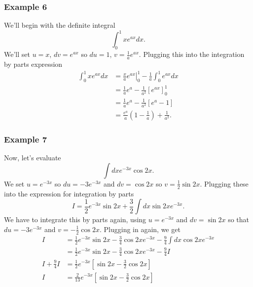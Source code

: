 \documentclass{article}
\begin{document}
\subsubsection*{Example 6}

We'll begin with the definite integral 
\begin{equation}
	\int_0^1 x e^{ax} dx .
\end{equation}
We'll set $u = x$, $dv = e^{ax}$ so $du = 1$, $v = \frac{1}{a} e^{ax}$.
Plugging this into the integration by parts expression 
\begin{align*}
	\int_0^1 x e^{ax} dx &= \left. \frac{x}{a} e^{ax} \right|_0^1 - \frac{1}{a} \int_0^1  e^{ax} dx \\
	&= \frac{1}{a} e^a - \frac{1}{a^2} \left[ e^{ax} \right]_0^1 \\
	&= \frac{1}{a} e^a - \frac{1}{a^2} \left[ e^{a} -1 \right] \\
	&= \frac{e^a}{a} \left( 1 - \frac{1}{a} \right) + \frac{1}{a^2} .
\end{align*}

\subsubsection*{Example 7}

Now, let's evaluate
\begin{equation}
	\int dx e^{-3x} \cos 2x .
\end{equation}
We set $u = e^{-3x}$ so $du = -3 e^{-3x}$ and $dv = \cos 2x$ so $v = \frac{1}{2} \sin 2x$.
Plugging these into the expression for integration by parts
\begin{equation*}
	I = \frac{1}{2} e^{-3x} \sin 2x + \frac{3}{2} \int dx \sin 2x e^{-3x} .
\end{equation*}
We have to integrate this by parts again, using $u = e^{-3x}$ and $dv = \sin 2x$ so that $du = -3 e^{-3x}$ and $v = -\frac{1}{2} \cos 2x$.
Plugging in again, we get
\begin{align*}
	I &= \frac{1}{2} e^{-3x} \sin 2x - \frac{3}{4} \cos 2x e^{-3x} - \frac{9}{4} \int dx \cos 2x e^{-3x} \\
	&= \frac{1}{2} e^{-3x} \sin 2x - \frac{3}{4} \cos 2x e^{-3x} - \frac{9}{4} I \\
	I + \frac{9}{4} I &= \frac{1}{2} e^{-3x} \left[ \sin 2x - \frac{3}{2} \cos 2x \right] \\
	I &= \frac{2}{13} e^{-3x} \left[ \sin 2x - \frac{3}{2} \cos 2x \right]
\end{align*}
\end{document}
